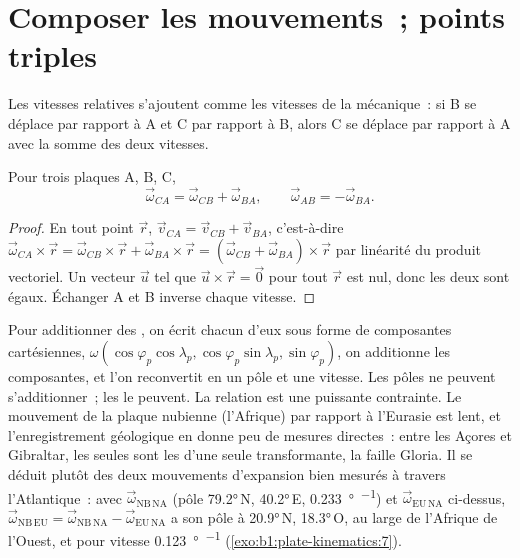 \section{Composer les mouvements~; points triples}

Les vitesses relatives s'ajoutent comme les vitesses de la mécanique~: si B se déplace par rapport à
A et C par rapport à B, alors C se déplace par rapport à A avec la somme des deux
vitesses.

\begin{proposition}\label{prop:b1:plate-kinematics:addition}
Pour trois plaques A, B, C,
\[
  \vec\omega_{CA} = \vec\omega_{CB} + \vec\omega_{BA}, \qquad
  \vec\omega_{AB} = -\vec\omega_{BA}.
\]
\end{proposition}

\begin{proof}
En tout point $\vec r$, $\vec v_{CA} = \vec v_{CB} + \vec v_{BA}$, c'est-à-dire
$\vec\omega_{CA}\times\vec r = \vec\omega_{CB}\times\vec r +
\vec\omega_{BA}\times\vec r = (\vec\omega_{CB} + \vec\omega_{BA})\times\vec r$
par linéarité du produit vectoriel. Un vecteur $\vec u$ tel que
$\vec u\times\vec r = \vec 0$ pour tout $\vec r$ est nul, donc les deux  sont égaux. Échanger A et B inverse chaque vitesse.
\end{proof}

Pour additionner des , on écrit chacun d'eux sous forme de composantes cartésiennes,
$\omega(\cos\varphi_p
\cos\lambda_p, \cos\varphi_p\sin\lambda_p, \sin\varphi_p)$, on additionne les composantes,
et l'on reconvertit en un pôle et une vitesse. Les pôles ne peuvent s'additionner~; les 
le peuvent. La relation est une puissante contrainte. Le mouvement de la plaque nubienne
(l'Afrique) par rapport à l'Eurasie est lent, et l'enregistrement géologique en donne peu de
mesures directes~: entre les Açores et Gibraltar, les seules sont les
 d'une seule transformante, la faille Gloria. Il se déduit plutôt des
deux mouvements d'expansion bien mesurés à travers l'Atlantique~: avec $\vec\omega_{\mathrm{NB\,NA}}$ (pôle
\ang{79.2}\,N, \ang{40.2}\,E, \qty{0.233}{\degree\per\Ma}) et
$\vec\omega_{\mathrm{EU\,NA}}$ ci-dessus, $\vec\omega_{\mathrm{NB\,EU}} =
\vec\omega_{\mathrm{NB\,NA}} - \vec\omega_{\mathrm{EU\,NA}}$ a son pôle à
\ang{20.9}\,N, \ang{18.3}\,O, au large de l'Afrique de l'Ouest, et pour vitesse
\qty{0.123}{\degree\per\Ma} (\cref{exo:b1:plate-kinematics:7}).

